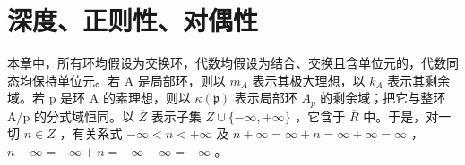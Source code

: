 \chapter{深度、正则性、对偶性}

本章中，所有环均假设为交换环，代数均假设为结合、交换且含单位元的，代数同态均保持单位元。若 A 是局部环，则以 \(m_{A}\) 表示其极大理想，以 \(k_{A}\) 表示其剩余域。若 p 是环 A 的素理想，则以 \(\kappa(\mathfrak{p})\) 表示局部环 \(A_{p}\) 的剩余域；把它与整环 A/p 的分式域恒同。以 \(\overline{Z}\) 表示子集 \(Z \cup \{-\infty, +\infty\}\) ，它含于 \(\overline{R}\) 中。于是，对一切 \(n \in Z\) ，有关系式 \(-\infty < n < +\infty\) 及 \(n + \infty = \infty + n = \infty + \infty = \infty\) ，\(n - \infty = -\infty + n = -\infty - \infty = -\infty\) 。


